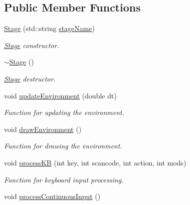 \subsection*{Public Member Functions}
\begin{DoxyCompactItemize}
\item 
\hyperlink{class_stage_a2ea3892c2b58307b9b47c9ef154bf4ab}{Stage} (std\+::string \hyperlink{class_stage_a6db07a70fa2bbc7ef6e92be5d43181b9}{stage\+Name})\hypertarget{class_stage_a2ea3892c2b58307b9b47c9ef154bf4ab}{}\label{class_stage_a2ea3892c2b58307b9b47c9ef154bf4ab}

\begin{DoxyCompactList}\small\item\em \hyperlink{class_stage}{Stage} constructor. \end{DoxyCompactList}\item 
\hyperlink{class_stage_af769a51df1efaaa5fca98008fb6f0c16}{$\sim$\+Stage} ()\hypertarget{class_stage_af769a51df1efaaa5fca98008fb6f0c16}{}\label{class_stage_af769a51df1efaaa5fca98008fb6f0c16}

\begin{DoxyCompactList}\small\item\em \hyperlink{class_stage}{Stage} destructor. \end{DoxyCompactList}\item 
void \hyperlink{class_stage_a3b0abe7d74c6d38cfedeab84a7506816}{update\+Environment} (double dt)
\begin{DoxyCompactList}\small\item\em Function for updating the environment. \end{DoxyCompactList}\item 
void \hyperlink{class_stage_a550f7504d9f1eb45a1f0a24c29b58fc8}{draw\+Environment} ()\hypertarget{class_stage_a550f7504d9f1eb45a1f0a24c29b58fc8}{}\label{class_stage_a550f7504d9f1eb45a1f0a24c29b58fc8}

\begin{DoxyCompactList}\small\item\em Function for drawing the environment. \end{DoxyCompactList}\item 
void \hyperlink{class_stage_ab0ac39aba2fa162499d2599c981ca3ed}{process\+KB} (int key, int scancode, int action, int mods)
\begin{DoxyCompactList}\small\item\em Function for keyboard input processing. \end{DoxyCompactList}\item 
void \hyperlink{class_stage_a92feebde5c5fd84711ce19f0e4d07552}{process\+Continuous\+Input} ()\hypertarget{class_stage_a92feebde5c5fd84711ce19f0e4d07552}{}\label{class_stage_a92feebde5c5fd84711ce19f0e4d07552}


\end{DoxyCompactItemize}
